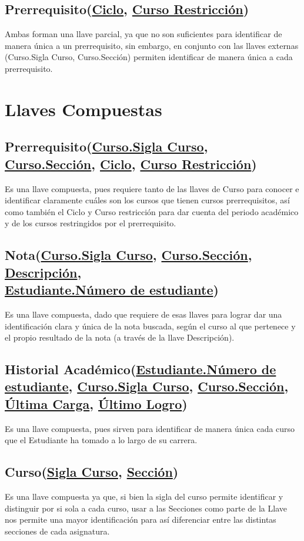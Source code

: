 \documentclass[12pt]{article}
\begin{document}
\subsection*{Prerrequisito(\underline{Ciclo}, \underline{Curso Restricción})}
Ambas forman una llave parcial, ya que no son suficientes para identificar de manera única a un prerrequisito, sin embargo, en conjunto con las llaves externas (Curso.Sigla Curso, Curso.Sección) permiten identificar de manera única a cada prerrequisito.
\section*{Llaves Compuestas}
\subsection*{Prerrequisito(\underline{Curso.Sigla Curso}, \underline{Curso.Sección}, \underline{Ciclo}, \underline{Curso Restricción})}
Es una llave compuesta, pues requiere tanto de las llaves de Curso para conocer e identificar claramente 
cuáles son los cursos que tienen cursos prerrequisitos, así como también el Ciclo y Curso restricción para dar cuenta del periodo académico y de los cursos restringidos por el prerrequisito. 
\subsection*{Nota(\underline{Curso.Sigla Curso}, \underline{Curso.Sección}, \underline{Descripción}, 
\\ \underline{Estudiante.Número de estudiante})}
Es una llave compuesta, dado que requiere de esas llaves para lograr dar una identificación clara y única de la nota buscada, según el curso al que pertenece y el propio resultado de la nota (a través de la llave Descripción). 
\subsection*{Historial Académico(\underline{Estudiante.Número de estudiante}, \underline{Curso.Sigla Curso}, \underline{Curso.Sección}, \underline{Última Carga}, \underline{Último Logro})}
Es una llave compuesta, pues sirven para identificar de manera única cada curso que el Estudiante ha tomado a lo largo de su carrera. 
\subsection*{Curso(\underline{Sigla Curso}, \underline{Sección})}
Es una llave compuesta ya que, si bien la sigla del curso permite identificar y distinguir por si sola a cada curso, usar a las Secciones como parte de la Llave nos permite una mayor identificación para así diferenciar entre las distintas secciones de cada asignatura.  
\newpage
\end{document}

